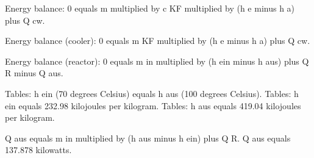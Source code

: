 Energy balance:  
0 equals m multiplied by c KF multiplied by (h e minus h a) plus Q cw.  

Energy balance (cooler):  
0 equals m KF multiplied by (h e minus h a) plus Q cw.  

Energy balance (reactor):  
0 equals m in multiplied by (h ein minus h aus) plus Q R minus Q aus.  

Tables:  
h ein (70 degrees Celsius) equals h aus (100 degrees Celsius).  
Tables: h ein equals 232.98 kilojoules per kilogram.  
Tables: h aus equals 419.04 kilojoules per kilogram.  

Q aus equals m in multiplied by (h aus minus h ein) plus Q R.  
Q aus equals 137.878 kilowatts.
